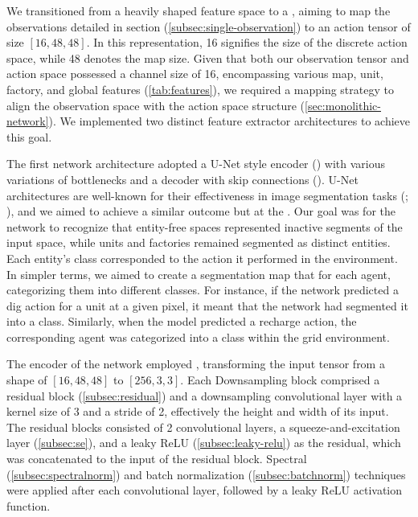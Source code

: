 \noindent We transitioned from a heavily shaped feature space to a , aiming to map the observations detailed in section (\autoref{subsec:single-observation}) to an action tensor of size $[16, 48, 48]$. In this representation, 16 signifies the size of the discrete action space, while 48 denotes the map size. Given that both our observation tensor and action space possessed a channel size of 16, encompassing various map, unit, factory, and global features (\autoref{tab:features}), we required a mapping strategy to align the observation space with the action space structure (\autoref{sec:monolithic-network}). We implemented two distinct feature extractor architectures to achieve this goal.

\bigskip

\noindent The first network architecture adopted a U-Net style encoder (\cite{ronneberger2015unet}) with various variations of bottlenecks and a decoder with skip connections (\cite{wu2020skip}). U-Net architectures are well-known for their effectiveness in image segmentation tasks (\cite{ehab2023performance}; \cite{ronneberger2015unet}), and we aimed to achieve a similar outcome but at the . Our goal was for the network to recognize that entity-free spaces represented inactive segments of the input space, while units and factories remained segmented as distinct entities. Each entity's class corresponded to the action it performed in the environment. In simpler terms, we aimed to create a segmentation map that  for each agent, categorizing them into different classes. For instance, if the network predicted a dig action for a unit at a given pixel, it meant that the network had segmented it into a  class. Similarly, when the model predicted a recharge action, the corresponding agent was categorized into a  class within the grid environment.

\bigskip

\noindent The encoder of the network employed , transforming the input tensor from a shape of $[16, 48, 48]$ to $[256,3,3]$. Each Downsampling block comprised a residual block (\autoref{subsec:residual}) and a downsampling convolutional layer with a kernel size of 3 and a stride of 2, effectively  the height and width of its input. The residual blocks consisted of 2 convolutional layers, a squeeze-and-excitation layer (\autoref{subsec:se}), and a leaky ReLU (\autoref{subsec:leaky-relu}) as the residual, which was concatenated to the input of the residual block. Spectral (\autoref{subsec:spectralnorm}) and batch normalization (\autoref{subsec:batchnorm}) techniques were applied after each convolutional layer, followed by a leaky ReLU activation function.

